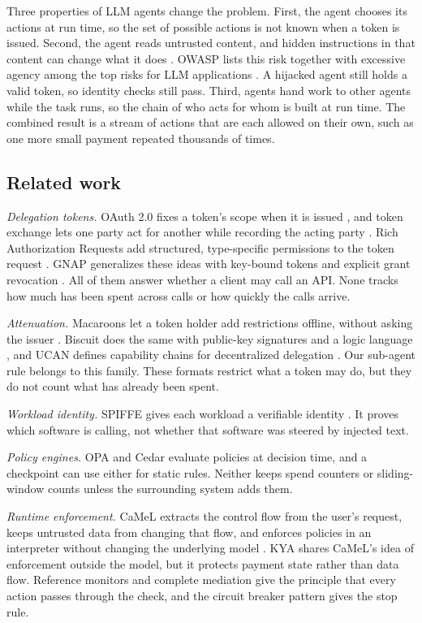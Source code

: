 \documentclass[conference]{IEEEtran}
\begin{document}
Three properties of LLM agents change the problem. First, the agent chooses its actions at run time, so the set of possible actions is not known when a token is issued. Second, the agent reads untrusted content, and hidden instructions in that content can change what it does \cite{b9}. OWASP lists this risk together with excessive agency among the top risks for LLM applications \cite{b10}. A hijacked agent still holds a valid token, so identity checks still pass. Third, agents hand work to other agents while the task runs, so the chain of who acts for whom is built at run time. The combined result is a stream of actions that are each allowed on their own, such as one more small payment repeated thousands of times.

\subsection{Related work}

\emph{Delegation tokens.} OAuth 2.0 fixes a token's scope when it is issued \cite{b11}, and token exchange lets one party act for another while recording the acting party \cite{b12}. Rich Authorization Requests add structured, type-specific permissions to the token request \cite{b13}. GNAP generalizes these ideas with key-bound tokens and explicit grant revocation \cite{b14}. All of them answer whether a client may call an API. None tracks how much has been spent across calls or how quickly the calls arrive.

\emph{Attenuation.} Macaroons let a token holder add restrictions offline, without asking the issuer \cite{b15}. Biscuit does the same with public-key signatures and a logic language \cite{b16}, and UCAN defines capability chains for decentralized delegation \cite{b17}. Our sub-agent rule belongs to this family. These formats restrict what a token may do, but they do not count what has already been spent.

\emph{Workload identity.} SPIFFE gives each workload a verifiable identity \cite{b18}. It proves which software is calling, not whether that software was steered by injected text.

\emph{Policy engines.} OPA \cite{b19} and Cedar \cite{b20} evaluate policies at decision time, and a checkpoint can use either for static rules. Neither keeps spend counters or sliding-window counts unless the surrounding system adds them.

\emph{Runtime enforcement.} CaMeL extracts the control flow from the user's request, keeps untrusted data from changing that flow, and enforces policies in an interpreter without changing the underlying model \cite{b21}. KYA shares CaMeL's idea of enforcement outside the model, but it protects payment state rather than data flow. Reference monitors \cite{b22} and complete mediation \cite{b23} give the principle that every action passes through the check, and the circuit breaker pattern \cite{b24} gives the stop rule.
\end{document}
